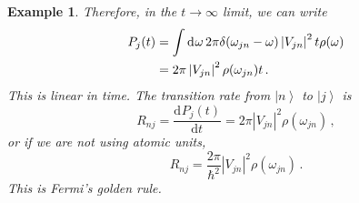 \documentclass{article}
\theoremstyle{plain}\theoremheaderfont{\normalfont\itshape}\theorembodyfont{\rmfamily}\theoremseparator{.}\newtheorem*{rem}{Remark}\newtheorem*{ex}{Example}\newtheorem*{proof}{Proof}\newtheorem*{altp}{Alternative proof}
\theoremstyle{plain}\theoremheaderfont{\normalfont\bfseries}\theorembodyfont{\rmfamily}\theoremseparator{.}\newtheorem{thm}{Theorem}[section]\newtheorem{lem}[thm]{Lemma}\newtheorem{prop}[thm]{Proposition}\newtheorem*{cor}{Corollary}\newtheorem{defn}[thm]{Definition}\newtheorem{clm}[thm]{Claim}\newtheorem{clminproof}{Claim}
\theoremstyle{break}\theoremheaderfont{\normalfont\itshape}\theorembodyfont{\rmfamily}\theoremseparator{.\medskip}\newtheorem*{proofskip}{Proof}\newtheorem*{exs}{Examples}\newtheorem*{rems}{Remarks}
\theoremstyle{break}\theoremheaderfont{\normalfont\bfseries}\theorembodyfont{\rmfamily}\theoremseparator{.\medskip}\newtheorem{lemskip}[thm]{Lemma}\newtheorem{defnskip}[thm]{Definition}\newtheorem{propskip}[thm]{Proposition}\newtheorem{thmskip}[thm]{Theorem}
\numberwithin{equation}{section}
\newcommand{\dd}[2][]{\mathrm{d}^{#1} #2\,}
\newcommand{\dv}[3][]{\frac{\mathrm{d}^{#1} #2}{{\mathrm{d} #3}^{#1}}}
\newcommand{\ket}[1]{\left| #1 \right\rangle}
\newcommand{\abs}[1]{\left| #1 \right|}
\begin{document}
\begin{ex}
        Therefore, in the \(t\to\infty\) limit, we can write
        \begin{align}
            P_j(t)&=\int\dd{\omega} 2\pi\delta(\omega_{jn}-\omega)\abs{V_{jn}}^2 t\rho(\omega)\notag \\
            &=2\pi\abs{V_{jn}}^2\rho(\omega_{jn})t\,.
        \end{align}
        This is linear in time. The transition rate from \(\ket{n}\) to \(\ket{j}\) is
        \begin{equation}
            R_{nj}=\dv{P_j(t)}{t}=2\pi\abs{V_{jn}}^2\rho(\omega_{jn})\,,
        \end{equation}
        or if we are not using atomic units,
        \begin{equation}
            R_{nj}=\frac{2\pi}{\hbar^2}\abs{V_{jn}}^2\rho(\omega_{jn})\,.
        \end{equation}
        This is \textit{Fermi's golden rule}.


\end{ex}
\end{document}
